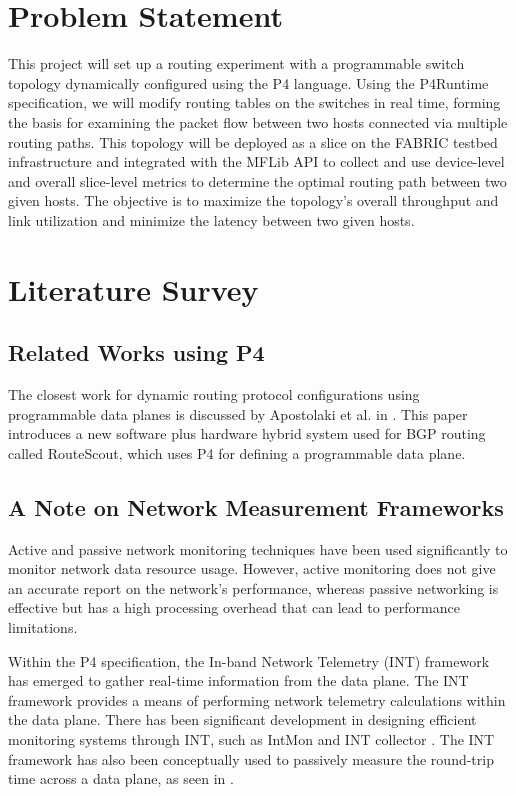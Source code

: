 \documentclass[conference]{IEEEtran}
\begin{document}
    \section{Problem Statement}
    This project will set up a routing experiment with a  programmable switch topology dynamically configured using the P4 language. Using the P4Runtime specification, we will modify routing tables on the switches in real time, forming the basis for examining the packet flow between two hosts connected via multiple routing paths. This topology will be deployed as a slice on the FABRIC testbed infrastructure and integrated with the MFLib API to collect and use device-level and overall slice-level metrics to determine the optimal routing path between two given hosts. The objective is to maximize the topology's overall throughput and link utilization and minimize the latency between two given hosts.
    
    \section{Literature Survey}
    \subsection{Related Works using P4}
    The closest work for dynamic routing protocol configurations using programmable data planes is discussed by Apostolaki et al. in \cite{b5}. This paper introduces a new software plus hardware hybrid system used for BGP routing called RouteScout, which uses P4 for defining a programmable data plane. 
    
    \subsection{A Note on Network Measurement Frameworks}
    Active and passive network monitoring techniques have been used significantly to monitor network data resource usage. However, active monitoring does not give an accurate report on the network’s performance, whereas passive networking is effective but has a high processing overhead that can lead to performance limitations.
    
    Within the P4 specification, the In-band Network Telemetry (INT) framework \cite{b6} has emerged to gather real-time information from the data plane. The INT framework provides a means of performing network telemetry calculations within the data plane. There has been significant development in designing efficient monitoring systems through INT, such as IntMon \cite{b7} and INT collector \cite{b8}. The INT framework has also been conceptually used to passively measure the round-trip time across a data plane, as seen in \cite{b9}.
\end{document}
